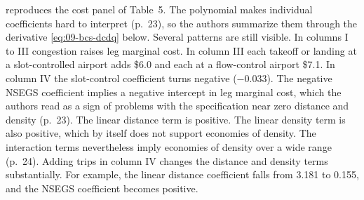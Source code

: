  reproduces the cost panel of Table~5. The polynomial makes individual coefficients
hard to interpret (p.~23), so the authors summarize them through the derivative \eqref{eq:09-bcs-dcdq}
below. Several patterns are still visible. In columns I to III congestion raises leg marginal cost. In
column III each takeoff or landing at a slot-controlled airport adds \$6.0 and each at a flow-control airport
\$7.1. In column IV the slot-control coefficient turns negative ($-0.033$). The negative NSEGS coefficient
implies a negative intercept in leg marginal cost, which the authors read as a sign of problems with the
specification near zero distance and density (p.~23). The linear distance term is positive. The linear
density term is also positive, which by itself does not support economies of density. The interaction terms
nevertheless imply economies of density over a wide range (p.~24). Adding trips in column IV changes the
distance and density terms substantially. For example, the linear distance coefficient falls from 3.181 to
0.155, and the NSEGS coefficient becomes positive.

